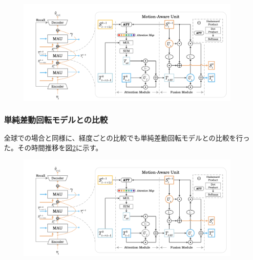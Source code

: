           \begin{figure}[h]
            \centering
            \includegraphics[width=150mm]{figures/mau.png}
            \caption{}
            \label{fig:exp1_mean_intensity_longitude_scatter}
          \end{figure}

        \subsubsection{単純差動回転モデルとの比較}
          全球での場合と同様に、経度ごとの比較でも単純差動回転モデルとの比較を行った。その時間推移を図\ref{fig:exp1_sdr_longitude_line}に示す。
          \begin{figure}[htbp]
            \centering
            \includegraphics[width=150mm]{figures/mau.png}
            \caption{}
            \label{fig:exp1_sdr_longitude_line}
          \end{figure}
          
